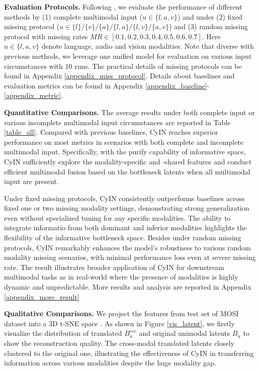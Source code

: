 \documentclass{article}
\begin{document}
\textbf{Evaluation Protocols.} Following \cite{zhao2021missing,lian2023gcnet, wang2023incomplete,zhang2024towards}, we evaluate the performance of different methods by (1) complete multimodal input ($u\in\{l,a,v\}$) and under (2) fixed missing protocol ($u\in\{l\}/\{v\}/\{a\}/\{l,a\}/\{l,v\}/\{a,v\}$) and (3) random missing protocol with missing rates $MR\in[0.1,0.2,0.3,0.4,0.5,0.6,0.7]$. Here $u\in\{l,a,v\}$ denote language, audio and vision modalities. Note that diverse with previous methods, we leverage one unified model for evaluation on various input circumstances with 10 runs. The practical details of missing protocols can be found in Appendix \ref{appendix_miss_protocol}. Details about baselines and evaluation metrics can be found in Appendix \ref{appendix_baseline}-\ref{appendix_metric}.

\textbf{Quantitative Comparisons.} The average results under both complete input or various incomplete multimodal input circumstances are reported in Table \ref{table_all}. Compared with previous baselines, CyIN reaches superior performance on most metrics in scenarios with both complete and incomplete multimodal input. 
Specifically, with the purify capability of informative space, CyIN sufficiently explore the modality-specific and -shared features and conduct efficient multimodal fusion based on the bottleneck latents when all multimodal input are present.

Under fixed missing protocols, CyIN consistently outperforms baselines across fixed one or two missing modality settings, demonstrating strong generalization even without specialized tuning for any specific modalities. The ability to integrate informatio from both dominant and inferior modalities highlights the flexibility of the informative bottleneck space. Besides under random missing protocols, CyIN remarkably enhances the model's robustness to various random modality missing scenarios, with minimal performance loss even at severe missing rate. The result illustrates broader application of CyIN for downstream multimodal tasks as in real-world where the presence of modalities is highly dynamic and unpredictable. More results and analysis are reported in Appendix \ref{appendix_more_result}

\textbf{Qualitative Comparisons.}
We project the features from test set of MOSI dataset into a 3D t-SNE space \cite{hinton2008visualizing}. As shown in Figure \ref{vis_latent}, we firstly visualize the distribution of translated $B^{rec}_u$ and original unimodal latents $B_u$ to show the reconstruction quality. The cross-modal translated latents closely clustered to the original one, illustrating the effectiveness of CyIN in transferring information across various modalities despite the huge modality gap.
\end{document}
